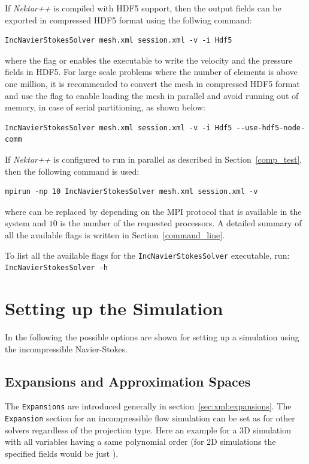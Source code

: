If \emph{Nektar++} is compiled with HDF5 support, then the output fields can be exported in compressed HDF5 format using the follwing command:
\begin{lstlisting}[style=BashInputStyle]
IncNavierStokesSolver mesh.xml session.xml -v -i Hdf5
\end{lstlisting}
%
where the flag  or  enables the  executable to write the velocity and the pressure fields in HDF5. For large scale problems where the number of elements is above one million, it is recommended to convert the mesh in compressed HDF5 format and use the flag  to enable loading the mesh in parallel and avoid running out of memory, in case of serial partitioning, as shown below:  
\begin{lstlisting}[style=BashInputStyle]
IncNavierStokesSolver mesh.xml session.xml -v -i Hdf5 --use-hdf5-node-comm
\end{lstlisting}
%
If \emph{Nektar++} is configured to run in parallel as described in Section~\ref{comp_test}, then the following command is used: 
\begin{lstlisting}[style=BashInputStyle]
 mpirun -np 10 IncNavierStokesSolver mesh.xml session.xml -v 
\end{lstlisting}

where  can be replaced by  depending on the MPI protocol that is available in the system and $10$ is the number of the requested processors. A detailed summary of all the available flags is written in Section~\ref{command_line}. 
%
\begin{notebox}
To list all the available flags for the \texttt{IncNavierStokesSolver} executable, run: \\ 
\texttt{IncNavierStokesSolver -h} \\
\end{notebox}

\section{Setting up the Simulation}
\label{VCSSetup}

In the following the possible options are shown for setting up a simulation using
the incompressible Navier-Stokes.

\subsection{Expansions and Approximation Spaces}
The \texttt{Expansions} are introduced generally in section~\ref{sec:xml:expansions}.
The \texttt{Expansion} section for an incompressible flow
simulation can be set as for other solvers regardless of the projection type.
Here an example for a 3D simulation with all variables having a same polynomial 
order (for 2D simulations the specified fields
would be just ).

